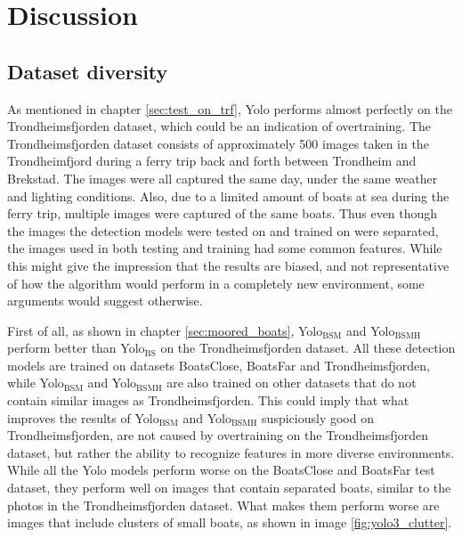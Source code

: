 \chapter{Discussion}

\section{Dataset diversity}
\label{dataset_divers}
As mentioned in chapter \ref{sec:test_on_trf}, Yolo performs almost perfectly on the Trondheimsfjorden dataset, which could be an indication of overtraining. The Trondheimsfjorden dataset consists of approximately 500 images taken in the Trondheimfjord during a ferry trip back and forth between Trondheim and Brekstad. The images were all captured the same day, under the same weather and lighting conditions. Also, due to a limited amount of boats at sea during the ferry trip, multiple images were captured of the same boats. Thus even though the images the detection models were tested on and trained on were separated, the images used in both testing and training had some common features. While this might give the impression that the results are biased, and not representative of how the algorithm would perform in a completely new environment, some arguments would suggest otherwise.

\vspace{3mm}

First of all, as shown in chapter \ref{sec:moored_boats}, Yolo$_{\text{BSM}}$ and Yolo$_{\text{BSMH}}$ perform better than Yolo$_{\text{BS}}$ on the Trondheimsfjorden dataset. All these detection models are trained on datasets BoatsClose, BoatsFar and Trondheimsfjorden, while Yolo$_{\text{BSM}}$ and Yolo$_{\text{BSMH}}$ are also trained on other datasets that do not contain similar images as Trondheimsfjorden. This could imply that what improves the results of Yolo$_{\text{BSM}}$ and Yolo$_{\text{BSMH}}$ suspiciously good on Trondheimsfjorden, are not caused by overtraining on the Trondheimsfjorden dataset, but rather the ability to recognize features in more diverse environments. While all the Yolo models perform worse on the BoatsClose and BoatsFar test dataset, they perform well on images that contain separated boats, similar to the photos in the Trondheimsfjorden dataset. What makes them perform worse are images that include clusters of small boats, as shown in image \ref{fig:yolo3_clutter}. 

